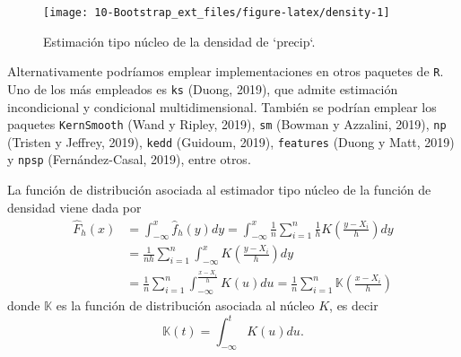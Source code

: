 \documentclass[
]{book}
\newenvironment{Shaded}{\begin{snugshade}}{\end{snugshade}}
\newcommand{\AttributeTok}[1]{\textcolor[rgb]{0.77,0.63,0.00}{#1}}
\newcommand{\CommentTok}[1]{\textcolor[rgb]{0.56,0.35,0.01}{\textit{#1}}}
\newcommand{\ConstantTok}[1]{\textcolor[rgb]{0.00,0.00,0.00}{#1}}
\newcommand{\DecValTok}[1]{\textcolor[rgb]{0.00,0.00,0.81}{#1}}
\newcommand{\FloatTok}[1]{\textcolor[rgb]{0.00,0.00,0.81}{#1}}
\newcommand{\FunctionTok}[1]{\textcolor[rgb]{0.00,0.00,0.00}{#1}}
\newcommand{\NormalTok}[1]{#1}
\newcommand{\OtherTok}[1]{\textcolor[rgb]{0.56,0.35,0.01}{#1}}
\newcommand{\StringTok}[1]{\textcolor[rgb]{0.31,0.60,0.02}{#1}}
\theoremstyle{break}
\theoremstyle{nonumberplain}
\renewcommand{\CommentTok}[1]{\textcolor[rgb]{0.41,0.41,0.41}{\texttt{#1}}}
\begin{document}
\begin{Shaded}
\end{Shaded}

\begin{figure}[!htb]

{\centering \texttt{[image: 10-Bootstrap\_ext\_files/figure-latex/density-1]} 

}

\caption{Estimación tipo núcleo de la densidad de `precip`.}\label{fig:density}
\end{figure}

Alternativamente podríamos emplear implementaciones en otros paquetes de \texttt{R}.
Uno de los más empleados es \texttt{ks} (Duong, 2019), que admite estimación incondicional y condicional multidimensional.
También se podrían emplear los paquetes \texttt{KernSmooth} (Wand y Ripley, 2019), \texttt{sm} (Bowman y Azzalini, 2019), \texttt{np} (Tristen y Jeffrey, 2019), \texttt{kedd} (Guidoum, 2019), \texttt{features} (Duong y Matt, 2019) y \texttt{npsp} (Fernández-Casal, 2019), entre otros.

La función de distribución asociada al estimador tipo núcleo de la función de densidad viene dada por
\[\begin{aligned}
\hat{F}_{h}\left( x \right) &= \int_{-\infty }^{x}\hat{f}_{h}\left( y \right) dy
=\int_{-\infty }^{x}\frac{1}{n}\sum_{i=1}^{n}\frac{1}{h}
K\left( \frac{y-X_i}{h} \right) dy \\
&= \frac{1}{nh}\sum_{i=1}^{n}\int_{-\infty }^{x}
K\left( \frac{y-X_i}{h} \right) dy \\
&= \frac{1}{n}\sum_{i=1}^{n}\int_{-\infty }^{\frac{x-X_i}{h}}K\left( u \right) du
=\frac{1}{n}\sum_{i=1}^{n}\mathbb{K}\left( \frac{x-X_i}{h} \right)
\end{aligned}\]
donde \(\mathbb{K}\) es la función de distribución asociada al núcleo \(K\), es decir
\[\mathbb{K}\left( t \right) =\int_{-\infty }^{t}K\left(u \right) du.\]
\end{document}
